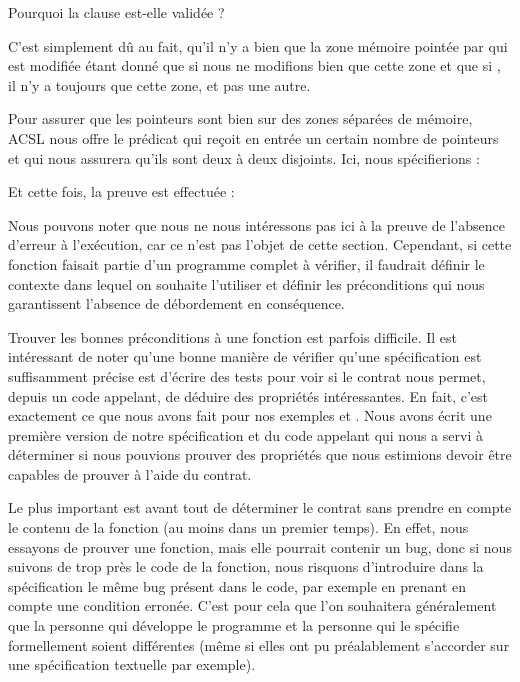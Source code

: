 \begin{Question}
Pourquoi la clause  est-elle validée ?

C'est simplement dû au fait, qu'il n'y a bien que la zone mémoire pointée par
 qui est modifiée étant donné que si  nous ne modifions bien
que cette zone et que si , il n'y a toujours que cette zone, et
pas une autre.
\end{Question}


Pour assurer que les pointeurs sont bien sur des zones séparées de mémoire,
ACSL nous offre le prédicat  qui reçoit en entrée
un certain nombre de pointeurs et qui nous assurera qu'ils sont deux à deux
disjoints. Ici, nous spécifierions :






Et cette fois, la preuve est effectuée :





Nous pouvons noter que nous ne nous intéressons pas ici à la preuve de
l'absence d'erreur à l'exécution, car ce n'est pas l'objet de cette section.
Cependant, si cette fonction faisait partie d'un programme complet à vérifier,
il faudrait définir le contexte dans lequel on souhaite l'utiliser et définir
les préconditions qui nous garantissent l'absence de débordement en conséquence.




Trouver les bonnes préconditions à une fonction est parfois difficile. Il est
intéressant de noter qu'une bonne manière de vérifier qu'une spécification est
suffisamment précise est d'écrire des tests pour voir si le contrat nous permet,
depuis un code appelant, de déduire des propriétés intéressantes. En fait,
c'est exactement ce que nous avons fait pour nos exemples  et
. Nous avons écrit une première version de notre spécification
et du code appelant qui nous a servi à déterminer si nous pouvions prouver des
propriétés que nous estimions devoir être capables de prouver à l'aide du
contrat.



Le plus important est avant tout de déterminer le contrat sans prendre en compte
le contenu de la fonction (au moins dans un premier temps). En effet, nous
essayons de prouver une fonction, mais elle pourrait contenir un bug, donc si
nous suivons de trop près le code de la fonction, nous risquons d'introduire
dans la spécification le même bug présent dans le code, par exemple en prenant
en compte une condition erronée. C'est pour cela que
l'on souhaitera généralement que la personne qui développe le programme et la
personne qui le spécifie formellement soient différentes (même si elles ont pu
préalablement s'accorder sur une spécification textuelle par exemple).



